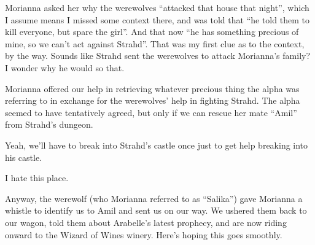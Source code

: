 Morianna asked her why the werewolves ``attacked that house that night'', which I assume means I missed some context there, and was told that ``he told them to kill everyone, but spare the girl''. And that now ``he has something precious of mine, so we can't act against Strahd''. That was my first clue as to the context, by the way. Sounds like Strahd sent the werewolves to attack Morianna's family? I wonder why he would so that.

Morianna offered our help in retrieving whatever precious thing the alpha was referring to in exchange for the werewolves' help in fighting Strahd. The alpha seemed to have tentatively agreed, but only if we can rescue her mate ``Amil'' from Strahd's dungeon.

Yeah, we'll have to break into Strahd's castle once just to get help breaking into his castle.

I hate this place.

Anyway, the werewolf (who Morianna referred to as ``Salika'') gave Morianna a whistle to identify us to Amil and sent us on our way. We ushered them back to our wagon, told them about Arabelle's latest prophecy, and are now riding onward to the Wizard of Wines winery. Here's hoping this goes smoothly.






